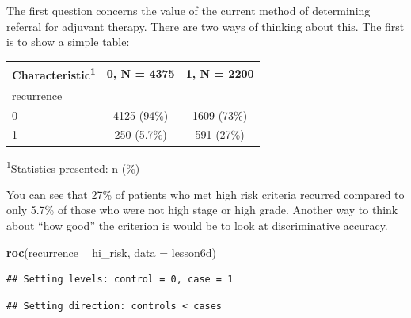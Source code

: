 \documentclass[]{book}
\newenvironment{Shaded}{\begin{snugshade}}{\end{snugshade}}
\newcommand{\DataTypeTok}[1]{\textcolor[rgb]{0.13,0.29,0.53}{#1}}
\newcommand{\KeywordTok}[1]{\textcolor[rgb]{0.13,0.29,0.53}{\textbf{#1}}}
\newcommand{\NormalTok}[1]{#1}
\newcommand{\OperatorTok}[1]{\textcolor[rgb]{0.81,0.36,0.00}{\textbf{#1}}}
\newcommand{\StringTok}[1]{\textcolor[rgb]{0.31,0.60,0.02}{#1}}
\begin{document}
The first question concerns the value of the current method of determining referral for adjuvant therapy. There are two ways of thinking about this. The first is to show a simple table:

\begin{Shaded}
\end{Shaded}

\captionsetup[table]{labelformat=empty,skip=1pt}
\begin{longtable}{lcc}
\toprule
\textbf{Characteristic}\textsuperscript{1} & \textbf{0}, N = 4375 & \textbf{1}, N = 2200 \\ 
\midrule
recurrence &  &  \\ 
0 & 4125 (94\%) & 1609 (73\%) \\ 
1 & 250 (5.7\%) & 591 (27\%) \\ 
\bottomrule
\end{longtable}
\vspace{-5mm}
\begin{minipage}{\linewidth}
\textsuperscript{1}Statistics presented: n (\%) \\ 
\end{minipage}

You can see that 27\% of patients who met high risk criteria recurred compared to only 5.7\% of those who were not high stage or high grade. Another way to think about ``how good'' the criterion is would be to look at discriminative accuracy.

\begin{Shaded}
\begin{Highlighting}[]
\KeywordTok{roc}\NormalTok{(recurrence }\OperatorTok{~}\StringTok{ }\NormalTok{hi_risk, }\DataTypeTok{data =}\NormalTok{ lesson6d)}
\end{Highlighting}
\end{Shaded}

\begin{verbatim}
## Setting levels: control = 0, case = 1
\end{verbatim}

\begin{verbatim}
## Setting direction: controls < cases
\end{verbatim}
\end{document}
